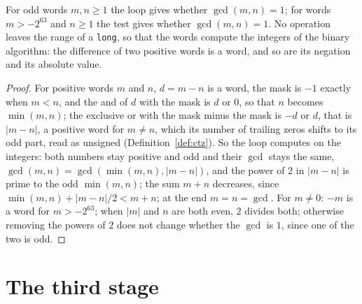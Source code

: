 \begin{lemma}\label{lem:relprime}
  \leanok
  For odd words $m, n \ge 1$ the loop gives whether $\gcd(m, n) = 1$; for words $m > -2^{63}$ and
  $n \ge 1$ the test gives whether $\gcd(m, n) = 1$. No operation leaves the range of a
  \verb|long|, so that the words compute the integers of the binary algorithm: the difference of
  two positive words is a word, and so are its negation and its absolute value.
\end{lemma}

\begin{proof}
  \leanok
  For positive words $m$ and $n$, $d = m - n$ is a word, the mask is $-1$ exactly when $m < n$,
  and the and of $d$ with the mask is $d$ or $0$, so that $n$ becomes $\min(m, n)$; the exclusive
  or with the mask minus the mask is $-d$ or $d$, that is $|m - n|$, a positive word for $m \ne
  n$, which its number of trailing zeros shifts to its odd part, read as unsigned
  (Definition~\ref{def:ctz}). So the loop computes on the integers: both numbers stay positive and
  odd and their $\gcd$ stays the same, $\gcd(m, n) = \gcd(\min(m, n), |m - n|)$, and the power of
  $2$ in $|m - n|$ is prime to the odd $\min(m, n)$; the sum $m + n$ decreases, since $\min(m, n) +
  |m - n| / 2 < m + n$; at the end $m = n = \gcd$. For $m \ne 0$: $-m$ is a word for $m >
  -2^{63}$; when $|m|$ and $n$ are both even, $2$ divides both; otherwise removing the powers of
  $2$ does not change whether the $\gcd$ is $1$, since one of the two is odd.
\end{proof}

\section{The third stage}\label{sec:stage3}

